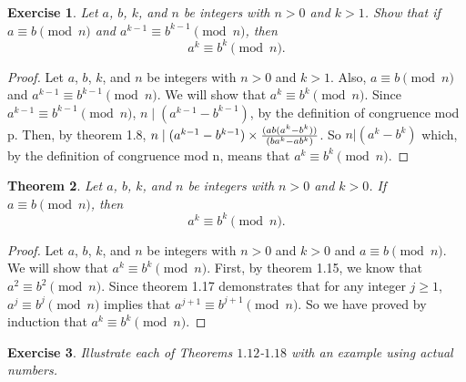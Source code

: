 \documentclass[12pt,leqno]{article}
\numberwithin{equation}{section}
\newtheorem{thm}{Theorem}[section]
\newtheorem{exer}[thm]{Exercise}
\theoremstyle{definition}
\begin{document}
\begin{exer}
Let $a$, $b$, $k$, and $n$ be integers with $n
> 0$ and $k > 1$. Show that if $a \equiv b \pmod{n}$ and
$a^{k-1} \equiv b^{k-1} \pmod{n}$,
then \[a^k \equiv b^k \pmod{n}.\]
\end{exer}
\begin{proof}[Proof]
Let $a$, $b$, $k$, and $n$ be integers with $n > 0$ and $k > 1$.  Also, $a \equiv b \pmod{n}$ and $a^{k-1} \equiv b^{k-1} \pmod{n}$.  We will show that $a^k \equiv b^k \pmod{n}$.  Since $a^{k-1} \equiv b^{k-1} \pmod{n}$, $n \mid (a^{k-1} - b^{k-1})$, by the definition of congruence mod p. Then, by theorem 1.8, $n \mid (a^{k-1} - b^{k-1}) \times {(a b (a^k-b^k)) \over (b a^k-a b^k)}$. So $n | (a^k - b^k)$ which, by the definition of congruence mod n, means that $a^k \equiv b^k \pmod{n}$.
\end{proof}

\pagebreak
\begin{thm}
Let $a$, $b$, $k$, and $n$ be integers with $n
> 0$ and $k > 0$.  If $a \equiv b \pmod{n}$,
then \[a^k \equiv b^k \pmod{n}.\]
\end{thm}

\begin{proof}[Proof]
Let $a$, $b$, $k$, and $n$ be integers with $n > 0$ and $k > 0$ and $a \equiv b \pmod{n}$. We will show that $a^k \equiv b^k \pmod{n}$.  First, by theorem 1.15, we know that $a^2 \equiv b^2 \pmod{n}$.  Since theorem 1.17 demonstrates that for any integer $j \geq 1$, $a^{j} \equiv b^{j} \pmod{n}$ implies that $a^{j+1} \equiv b^{j+1} \pmod{n}$.  So we have proved by induction that $a^k \equiv b^k \pmod{n}$.
\end{proof}


\begin{exer}
Illustrate each of Theorems $1.12$-$1.18$ with
an example using actual numbers.
\end{exer}
\end{document}
